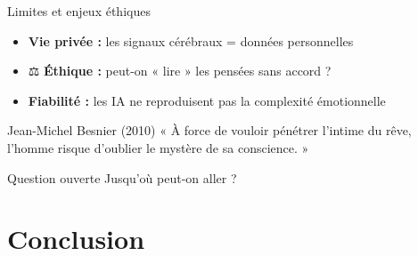 \documentclass[aspectratio=169]{beamer}
\begin{document}
\begin{frame}{Limites et enjeux éthiques} \label{limites}

\begin{itemize}
  \item    \textbf{Vie privée :} les signaux cérébraux = données personnelles
  \vspace{0.4cm}
  \item ⚖ \textbf{Éthique :} peut-on « lire » les pensées sans accord ?
  \vspace{0.4cm}
  \item    \textbf{Fiabilité :} les IA ne reproduisent pas la complexité émotionnelle
\end{itemize}

\vspace{0.8cm}

\begin{exampleblock}{Jean-Michel Besnier (2010)}
\small « À force de vouloir pénétrer l'intime du rêve, l'homme risque d'oublier le mystère de sa conscience. »
\end{exampleblock}

\vspace{0.5cm}

\begin{block}{Question ouverte}
Jusqu'où peut-on aller ?
\end{block}

\end{frame}


\section{Conclusion}
\end{document}
